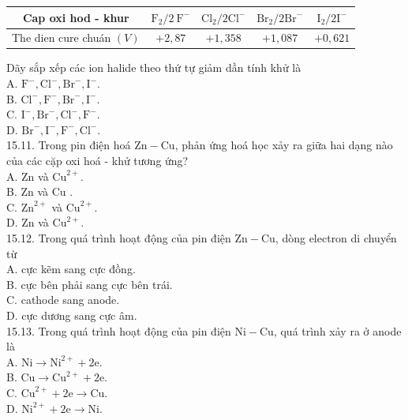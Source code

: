 \documentclass[10pt]{article}
\begin{document}
\begin{center}
\begin{tabular}{|c|c|c|c|c|}
\hline
Cap oxi hod - khur & $\mathrm{F}_{2} / 2 \mathrm{~F}^{-}$ & $\mathrm{Cl}_{2} / 2 \mathrm{Cl}^{-}$ & $\mathrm{Br}_{2} / 2 \mathrm{Br}^{-}$ & $\mathrm{I}_{2} / 2 \mathrm{I}^{-}$ \\
\hline
The dien cure chuán $(V)$ & $+2,87$ & $+1,358$ & $+1,087$ & $+0,621$ \\
\hline
\end{tabular}
\end{center}

Dãy sắp xếp các ion halide theo thứ tự giảm dần tính khử là\\
A. $\mathrm{F}^{-}, \mathrm{Cl}^{-}, \mathrm{Br}^{-}, \mathrm{I}^{-}$.\\
B. $\mathrm{Cl}^{-}, \mathrm{F}^{-}, \mathrm{Br}^{-}, \mathrm{I}^{-}$.\\
C. $\mathrm{I}^{-}, \mathrm{Br}^{-}, \mathrm{Cl}^{-}, \mathrm{F}^{-}$.\\
D. $\mathrm{Br}^{-}, \mathrm{I}^{-}, \mathrm{F}^{-}, \mathrm{Cl}^{-}$.\\
15.11. Trong pin điện hoá $\mathrm{Zn}-\mathrm{Cu}$, phản ứng hoá học xảy ra giữa hai dạng nào của các cặp oxi hoá - khử tương ứng?\\
A. Zn và $\mathrm{Cu}^{2+}$.\\
B. Zn và Cu .\\
C. $\mathrm{Zn}^{2+}$ và $\mathrm{Cu}^{2+}$.\\
D. Zn và $\mathrm{Cu}^{2+}$.\\
15.12. Trong quá trình hoạt động của pin điện $\mathrm{Zn}-\mathrm{Cu}$, dòng electron di chuyển từ\\
A. cực kẽm sang cực đồng.\\
B. cực bên phải sang cực bên trái.\\
C. cathode sang anode.\\
D. cực dương sang cực âm.\\
15.13. Trong quá trình hoạt động của pin điện $\mathrm{Ni}-\mathrm{Cu}$, quá trình xảy ra ở anode là\\
A. $\mathrm{Ni} \rightarrow \mathrm{Ni}^{2+}+2 \mathrm{e}$.\\
B. $\mathrm{Cu} \rightarrow \mathrm{Cu}^{2+}+2 \mathrm{e}$.\\
C. $\mathrm{Cu}^{2+}+2 \mathrm{e} \rightarrow \mathrm{Cu}$.\\
D. $\mathrm{Ni}^{2+}+2 \mathrm{e} \rightarrow \mathrm{Ni}$.\\
\end{document}
